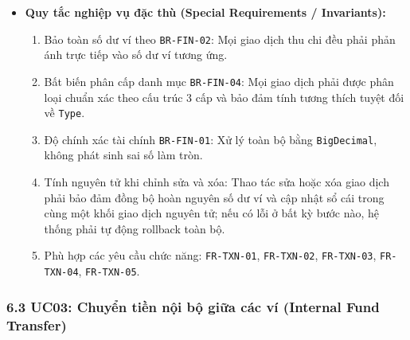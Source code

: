 \documentclass[11pt,a4paper]{article}
\providecommand{\tightlist}{
  \setlength{\itemsep}{0pt}\setlength{\parskip}{0pt}}
\begin{document}
\begin{itemize}
\begin{itemize}
    \begin{itemize}
    \tightlist
    \item
      2c4a1. Tại bước 2c4, hệ thống phát hiện việc xóa giao dịch thu
      nhập sẽ làm số dư ví hiện tại rơi vào số âm (do tiền từ khoản thu
      này đã được chi tiêu hoặc chuyển đi trong các giao dịch kế tiếp).
    \item
      2c4a2. Hệ thống từ chối thao tác xóa và hiển thị thông báo: "Không
      thể xóa giao dịch thu nhập này vì sẽ làm số dư ví bị âm. Vui lòng
      kiểm tra lại các khoản chi tiêu liên quan của ví trước khi thực
      hiện".
    \end{itemize}
  \end{itemize}
\item
  \textbf{Quy tắc nghiệp vụ đặc thù (Special Requirements /
  Invariants):}

  \begin{enumerate}
  \def\labelenumi{\arabic{enumi}.}
  \tightlist
  \item
    Bảo toàn số dư ví theo \texttt{BR-FIN-02}: Mọi giao dịch thu chi đều
    phải phản ánh trực tiếp vào số dư ví tương ứng.
  \item
    Bất biến phân cấp danh mục \texttt{BR-FIN-04}: Mọi giao dịch phải
    được phân loại chuẩn xác theo cấu trúc 3 cấp và bảo đảm tính tương
    thích tuyệt đối về \texttt{Type}.
  \item
    Độ chính xác tài chính \texttt{BR-FIN-01}: Xử lý toàn bộ bằng
    \texttt{BigDecimal}, không phát sinh sai số làm tròn.
  \item
    Tính nguyên tử khi chỉnh sửa và xóa: Thao tác sửa hoặc xóa giao dịch
    phải bảo đảm đồng bộ hoàn nguyên số dư ví và cập nhật sổ cái trong
    cùng một khối giao dịch nguyên tử; nếu có lỗi ở bất kỳ bước nào, hệ
    thống phải tự động rollback toàn bộ.
  \item
    Phù hợp các yêu cầu chức năng: \texttt{FR-TXN-01},
    \texttt{FR-TXN-02}, \texttt{FR-TXN-03}, \texttt{FR-TXN-04},
    \texttt{FR-TXN-05}.
  \end{enumerate}
\end{itemize}

\subsubsection{6.3 UC03: Chuyển tiền nội bộ giữa các ví (Internal Fund
Transfer)}\label{63-uc03-chuyux1ec3n-tiux1ec1n-nux1ed9i-bux1ed9-giux1eefa-cuxe1c-vuxed-internal-fund-transfer}
\end{document}
